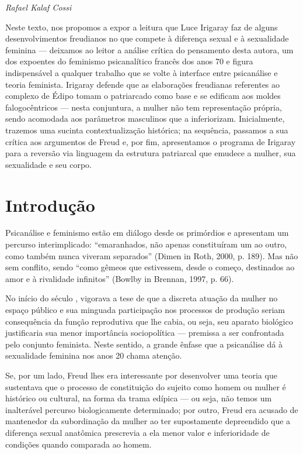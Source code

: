 \begin{flushright}
\emph{Rafael Kalaf Cossi}
\end{flushright}

Neste texto, nos propomos a expor a leitura que Luce Irigaray faz de
alguns desenvolvimentos freudianos no que compete à diferença sexual e à
sexualidade feminina --- deixamos ao leitor a análise crítica do
pensamento desta autora, um dos expoentes do feminismo psicanalítico
francês dos anos 70 e figura indispensável a qualquer trabalho que se
volte à interface entre psicanálise e teoria feminista. Irigaray defende
que as elaborações freudianas referentes ao complexo de Édipo tomam o
patriarcado como base e se edificam aos moldes falogocêntricos --- nesta
conjuntura, a mulher não tem representação própria, sendo acomodada aos
parâmetros masculinos que a inferiorizam. Inicialmente, trazemos uma
sucinta contextualização histórica; na sequência, passamos a sua crítica
aos argumentos de Freud e, por fim, apresentamos o programa de Irigaray
para a reversão via linguagem da estrutura patriarcal que emudece a
mulher, sua sexualidade e seu corpo.

\section{Introdução}

Psicanálise e feminismo estão em diálogo desde os primórdios e
apresentam um percurso interimplicado: ``emaranhados, não apenas
constituíram um ao outro, como também nunca viveram separados'' (Dimen
in Roth, 2000, p. 189). Mas não sem conflito, sendo ``como gêmeos que
estivessem, desde o começo, destinados ao amor e à rivalidade
infinitos'' (Bowlby in Brennan, 1997, p. 66).

No início do século , vigorava a tese de que a discreta atuação da
mulher no espaço público e sua minguada participação nos processos de
produção seriam consequência da função reprodutiva que lhe cabia, ou
seja, seu aparato biológico justificaria sua menor importância
sociopolítica --- premissa a ser confrontada pelo conjunto feminista.
Neste sentido, a grande ênfase que a psicanálise dá à sexualidade
feminina nos anos 20 chama atenção.

Se, por um lado, Freud lhes era interessante por desenvolver uma teoria
que sustentava que o processo de constituição do sujeito como homem ou
mulher é histórico ou cultural, na forma da trama edípica --- ou seja,
não temos um inalterável percurso biologicamente determinado; por outro,
Freud era acusado de mantenedor da subordinação da mulher ao ter
supostamente depreendido que a diferença sexual anatômica prescrevia a
ela menor valor e inferioridade de condições quando comparada ao homem.

